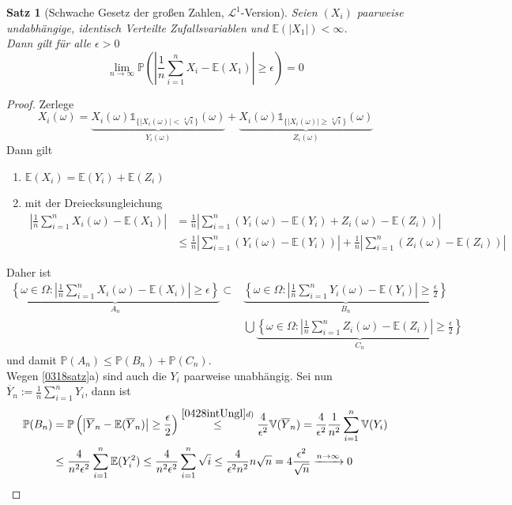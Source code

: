 \documentclass[10pt,a4paper]{article}
\newcommand{\ol}[1]{\overline{#1}}
\newcommand{\abs}[1]{\left|#1\right|}
\newcommand{\cha}{\mathds{1}}
\newcommand{\Prb}{\mathbb P}
\newcommand{\Epv}{\ensuremath{\mathbb{E}}}
\newcommand{\Var}{\mathbb{V}}
\newcommand{\scL}{\mathscr L}
\theoremstyle{plain}
\newtheorem{satz}[theorem]{Satz}
\theoremstyle{definition}
\theoremstyle{remark}
\begin{document}
	\begin{satz}[Schwache Gesetz der großen Zahlen, $\scL^1$-Version]\label{0504satzGGZL^1}
		Seien $(X_i)$ paarweise undabhängige, identisch Verteilte Zufallsvariablen und $\Epv(|X_1|)<\infty$.\\
		Dann gilt für alle $\epsilon>0$
		\[\lim\limits_{n\to\infty}\Prb\left(\abs{\frac{1}{n}\sum_{i=1}^{n}X_i-\Epv(X_1)}\geq \epsilon\right)=0\]
	\end{satz}
	\begin{proof}
		Zerlege 
		\[X_i(\omega)=\underbrace{X_i(\omega)\cha_{\{|X_i(\omega)|<\sqrt[4]{i}\}}(\omega)}_{Y_i(\omega)}
		+\underbrace{X_i(\omega)\cha_{\{|X_i(\omega)|\geq\sqrt[4]{i}\}}(\omega)}_{Z_i(\omega)}\]
		Dann gilt
		\begin{enumerate}
			\item $\Epv(X_i)=\Epv(Y_i)+\Epv(Z_i)$
			\item mit der Dreiecksungleichung
			\begin{align*}
			\abs{\frac{1}{n}\sum_{i=1}^{n}X_i(\omega)-\Epv(X_1)}&=\frac{1}{n}\abs{\sum_{i=1}^{n}\left(Y_i(\omega)-\Epv(Y_i)+Z_i(\omega)-\Epv(Z_i)\right)}\\
			&\leq \frac{1}{n}\abs{\sum_{i=1}^{n}\left(Y_i(\omega)-\Epv(Y_i)\right)}
			 +\frac{1}{n}\abs{\sum_{i=1}^{n}\left(Z_i(\omega)-\Epv(Z_i)\right)}
			\end{align*}
		\end{enumerate}
	Daher ist
	\begin{align*}
	\underbrace{\left\{\omega\in\Omega:\abs{\frac{1}{n}\sum_{i=1}^{n}X_i(\omega)-\Epv(X_i)}\geq\epsilon\right\}}_{A_n}\subset&
	\underbrace{\left\{\omega\in\Omega:\abs{\frac{1}{n}\sum_{i=1}^{n}Y_i(\omega)-\Epv(Y_i)}\geq\frac{\epsilon}{2}\right\}}_{B_n}\\&\bigcup
	\underbrace{\left\{\omega\in\Omega:\abs{\frac{1}{n}\sum_{i=1}^{n}Z_i(\omega)-\Epv(Z_i)}\geq\frac{\epsilon}{2}\right\}}_{C_n}
	\end{align*}
	und damit $\Prb(A_n)\leq\Prb(B_n)+\Prb(C_n)$.\\
	Wegen \ref{0318satz}a) sind auch die $Y_i$ paarweise unabhängig. Sei nun $\ol{Y}_n:=\frac{1}{n}\sum_{i=1}^{n}Y_i$, dann ist
	\begin{align*}
	\Prb(B_n)&=\Prb\left(\abs{\ol{Y}_n-\Epv(\ol{Y}_n)}\geq \frac{\epsilon}{2}\right)\overset{\ref{0428intUngl}d)}{\leq}\frac{4}{\epsilon^2}\Var(\ol{Y}_n)=\frac{4}{\epsilon^2}\frac{1}{n^2}\sum_{i=1}^{n}\Var(Y_i)\\
	&\leq\frac{4}{n^2\epsilon^2}\sum_{i=1}^{n}\Epv(Y_i^2)\leq\frac{4}{n^2\epsilon^2}\sum_{i=1}^{n}\sqrt{i}\leq\frac{4}{\epsilon^2n^2}n\sqrt{n}=4\frac{\epsilon^2}{\sqrt{n}}\xrightarrow{n\to\infty}0

\end{align*}
\end{proof}
\end{document}
